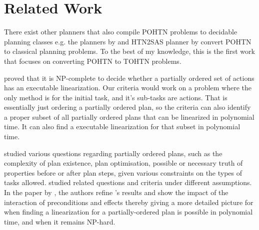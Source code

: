 \documentclass[letterpaper]{article} %
\begin{document}




\section{Related Work}
There exist other planners that also compile POHTN problems to decidable planning classes e.g. the planners by \cite{HTN2STRIPS} and HTN2SAS planner by \cite{HTN2SAS} convert POHTN to classical planning problems. To the best of my knowledge, this is the first work that focuses on converting POHTN to TOHTN problems.

\cite{ErolHTNExpressivity} proved that it is NP-complete to decide whether a partially ordered set
of actions has an executable linearization. Our criteria would work on a problem where the only method is for the initial task, and it’s sub-tasks are actions. That is essentially just ordering a partially ordered plan, so the criteria can also identify a proper subset of all partially ordered plans that can be linearized in polynomial time. It can also find a executable linearization for that subset in polynomial time.


\cite{NEBEL1994125} studied various questions regarding partially ordered plans, such as the complexity of plan existence, plan optimisation, possible or necessary truth of properties before or after plan steps, given various constraints on the types of tasks allowed.  \cite{KambhampatiModalTruth1996} studied related questions and criteria under different assumptions.
In the paper by \cite{TanGruningerPOPlanComplexity}, the authors refine \cite{NEBEL1994125}'s results and show the impact of the interaction of preconditions and effects thereby giving a more detailed picture for when finding a linearization for a partially-ordered plan is possible in polynomial time, and when it remains NP-hard. 
\end{document}
